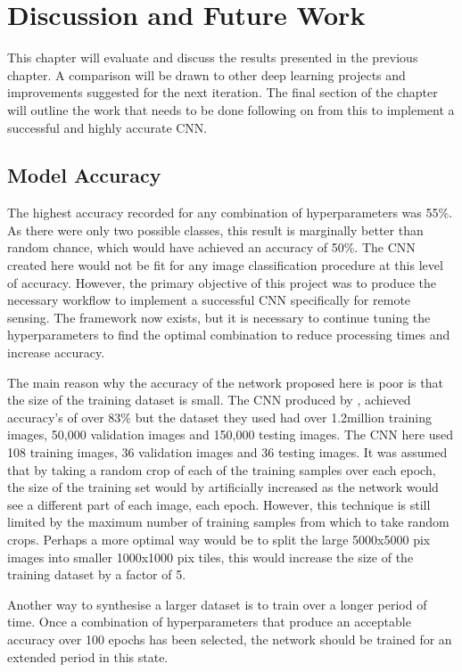 \chapter{Discussion and Future Work}
This chapter will evaluate and discuss the results presented in the previous chapter. A comparison will be drawn to other deep learning projects and improvements suggested for the next iteration. The final section of the chapter will outline the work that needs to be done following on from this to implement a successful and highly accurate CNN.
\section{Model Accuracy}
The highest accuracy recorded for any combination of hyperparameters was 55\%. As there were only two possible classes, this result is marginally better than random chance, which would have achieved an accuracy of 50\%. The CNN created here would not be fit for any image classification procedure at this level of accuracy. However, the primary objective of this project was to produce the necessary workflow to implement a successful CNN specifically for remote sensing. The framework now exists, but it is necessary to continue tuning the hyperparameters to find the optimal combination to reduce processing times and increase accuracy. 
\par
The main reason why the accuracy of the network proposed here is poor is that the size of the training dataset is small. The CNN produced by \citet{krizhevsky17}, achieved accuracy's of over 83\% but the dataset they used had over 1.2million training images, 50,000 validation images and 150,000 testing images. The CNN here used 108 training images, 36 validation images and 36 testing images. It was assumed that by taking a random crop of each of the training samples over each epoch, the size of the training set would by artificially increased as the network would see a different part of each image, each epoch. However, this technique is still limited by the maximum number of training samples from which to take random crops. Perhaps a more optimal way would be to split the large 5000x5000 pix images into smaller 1000x1000 pix tiles, this would increase the size of the training dataset by a factor of 5. 
\par
Another way to synthesise a larger dataset is to train over a longer period of time. Once a combination of hyperparameters that produce an acceptable accuracy over 100 epochs has been selected, the network should be trained for an extended period in this state.  

